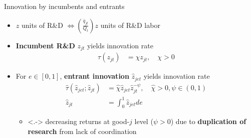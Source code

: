 \documentclass[english,usenames,dvipsnames]{beamer}
\begin{document}
\begin{frame}{Innovation by incumbents and entrants}
	\begin{itemize}
		\item<+-> $z$ units of R\&D $\Leftrightarrow (\frac{\bar{q}_{jt}}{Q_t})z$ units of R\&D labor
		\bigskip
		\item<+-> \alert{\textbf{Incumbent R\&D}} $z_{jt}$ yields innovation rate 
		\begin{align*}
		\tau(z_{jt}) &= \chi z_{jt}, \quad \chi > 0
		\end{align*}
		\item<+-> For $e \in [0,1]$, \alert{\textbf{entrant innovation}} $\hat{z}_{jet}$ yields innovation rate
		\begin{align*}
		\hat{\tau}(\hat{z}_{jet};\hat{z}_{jt}) &= \hat{\chi} \hat{z}_{jet} \hat{z}_{jt}^{-\psi}, \quad \hat{\chi} > 0, \psi \in (0,1) \\
		\hat{z}_{jt} &= \int_0^1 \hat{z}_{jet} de
		\end{align*}
		\begin{itemize}
			\item<.-> decreasing returns at good-$j$ level ($\psi > 0$) due to \textbf{\alert{duplication of research}} from lack of coordination
		\end{itemize}
	\end{itemize}
\end{frame}
\end{document}
